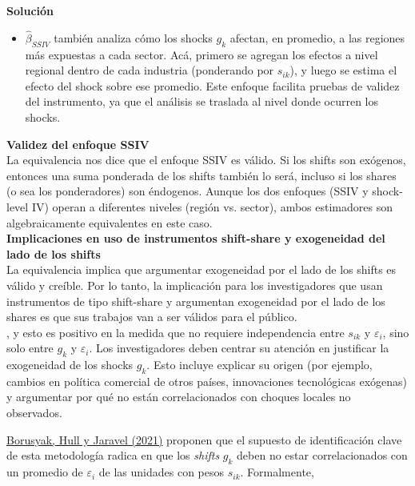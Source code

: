 \documentclass[a4paper, answers, addpoints, 11pt]{exam}
\newenvironment{solucion}{%
  \begin{mdframed}[
    backgroundcolor=blue!5,    %
    linecolor=blue!50,          %
    linewidth=2pt,              %
    leftmargin=10pt,            %
    rightmargin=8pt,           %
    topline=true,              %
    bottomline=true,            %
    roundcorner=10pt,           %
    innerleftmargin=10pt,       %
    innerrightmargin=10pt,      %
    innerbottommargin=10pt,     %
    innertopmargin=10pt         %
  ]%
  \begin{tcolorbox}[colframe=blue!50!black, colback=blue!50, coltitle=white, sharp corners=all, boxrule=1mm, width=\textwidth, halign=left, valign=center, top=0mm, bottom=0mm, left=0mm, right=0mm] \textbf{Solución} \end{tcolorbox} }{\end{mdframed}}
\begin{document}
\begin{enumerate}
\begin{enumerate}[label=\alph*)]
\begin{solucion}
\begin{itemize}
                 \item $\hat{\beta}_{SSIV}$ también analiza cómo los shocks $g_k$ afectan, en promedio, a las regiones más expuestas a cada sector. Acá, primero se agregan los efectos a nivel regional dentro de cada industria (ponderando por $s_{ik}$), y luego se estima el efecto del shock sobre ese promedio. Este enfoque facilita pruebas de validez del instrumento, ya que el análisis se traslada al nivel donde ocurren los shocks.
                  \end{itemize}

         \textbf{Validez del enfoque SSIV}\\
         La equivalencia nos dice que el enfoque SSIV es válido. Si los shifts son exógenos, entonces una suma ponderada de los shifts también lo será, incluso si los shares (o sea los ponderadores) son éndogenos. Aunque los dos enfoques (SSIV y shock-level IV) operan a diferentes niveles (región vs. sector), ambos estimadores son algebraicamente equivalentes en este caso.\\

        \textbf{Implicaciones en uso de instrumentos  shift-share y exogeneidad del lado de los shifts}\\
        La equivalencia implica que argumentar exogeneidad por el lado de los shifts es válido y creíble. Por lo tanto, la implicación para los investigadores que usan instrumentos de tipo shift-share y argumentan exogeneidad por el lado de los shares es que sus trabajos van a ser válidos para el público. \\, y esto es positivo en la medida que  no requiere independencia entre $s_{ik}$ y $\varepsilon_i$, sino solo entre $g_k$ y $\varepsilon_i$. 
        Los investigadores deben centrar su atención en justificar la exogeneidad de los shocks $g_k$. Esto incluye explicar su origen (por ejemplo, cambios en política comercial de otros países, innovaciones tecnológicas exógenas) y argumentar por qué no están correlacionados con choques locales no observados. 

        
\end{solucion}

     
            \end{enumerate}

\end{enumerate}
\href{https://academic.oup.com/restud/article-abstract/89/1/181/6294942?redirectedFrom=fulltext}{Borusyak, Hull y Jaravel (2021)} proponen que el supuesto de identificación clave de esta metodología radica en que los \textit{shifts} $g_k$ deben no estar correlacionados con un promedio de $\varepsilon_i$ de las unidades con pesos $s_{ik}$. Formalmente,
\end{document}
